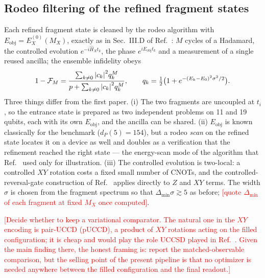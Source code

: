 \documentclass[
  aps,
  prc,
  reprint,
  superscriptaddress,
  floatfix,
  nofootinbib
]{revtex4-2}
\newcommand{\todo}[1]{\textcolor{red}{[#1]}}
\newcommand{\Eobj}{E_{\mathrm{obj}}}
\begin{document}
\subsection{Rodeo filtering of the refined fragment states}
\label{sec:rodeo-prep}
Each refined fragment state is cleaned by the rodeo algorithm with
$\Eobj=E^{(0)}_X(M_X)$, exactly as in Sec.~III.D of
Ref.~\cite{EigenQPairing2026}: $M$ cycles of a Hadamard, the controlled
evolution $e^{-i\hat H_Xt_k}$, the phase $e^{i\Eobj t_k}$ and a measurement
of a single reused ancilla; the ensemble infidelity obeys
\begin{equation}
  1-\mathcal F_M=\frac{\sum_{k\neq0}\abs{c_k}^2q_k^M}{p+\sum_{k\neq0}\abs{c_k}^2q_k^M},
  \qquad q_k=\tfrac12\big(1+e^{-(E_k-E_0)^2\sigma^2/2}\big).
  \label{eq:fid}
\end{equation}
Three things differ from the first paper.  (i) The two fragments are
uncoupled at $t_i$, so the entrance state is prepared as two independent
problems on 11 and 19 qubits, each with its own $\Eobj$, and the ancilla can
be shared.  (ii) $\Eobj$ is known classically for the benchmark
($d_P(5)=154$), but a rodeo \emph{scan} on the refined state locates it on a
device as well and doubles as a verification that the refinement reached the
right state --- the energy-scan mode of the algorithm that
Ref.~\cite{EigenQPairing2026} used only for illustration.  (iii) The
controlled evolution is two-local: a controlled $XY$ rotation costs a fixed
small number of CNOTs, and the controlled-reversal-gate construction of
Ref.~\cite{BeeLindgren2022} applies directly to $Z$ and $XY$ terms.  The
width $\sigma$ is chosen from the fragment spectrum so that
$\Delta_{\min}\sigma\gtrsim5$ as before; \todo{quote $\Delta_{\min}$ of
each fragment at fixed $M_X$ once computed}.

\todo{Decide whether to keep a variational comparator.  The natural one in
the $XY$ encoding is pair-UCCD (pUCCD), a product of $XY$ rotations acting
on the filled configuration; it is cheap and would play the role UCCSD
played in Ref.~\cite{EigenQPairing2026}.  Given the main finding there,
the honest framing is: report the matched-observable comparison, but the
selling point of the present pipeline is that no optimizer is needed
anywhere between the filled configuration and the final readout.}

\end{document}
